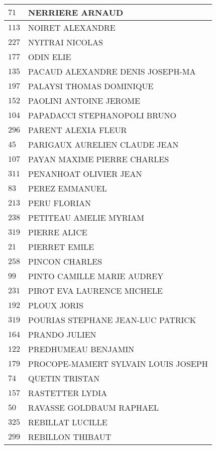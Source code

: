 \begin{xltabular}{\linewidth}{|l|X|}
    \hline
    $71$ & NERRIERE ARNAUD \\
    \hline
    $113$ & NOIRET ALEXANDRE \\
    \hline
    $227$ & NYITRAI NICOLAS \\
    \hline
    $177$ & ODIN ELIE \\
    \hline
    $135$ & PACAUD ALEXANDRE DENIS JOSEPH-MA \\
    \hline
    $197$ & PALAYSI THOMAS DOMINIQUE \\
    \hline
    $152$ & PAOLINI ANTOINE JEROME \\
    \hline
    $104$ & PAPADACCI STEPHANOPOLI BRUNO \\
    \hline
    $296$ & PARENT ALEXIA FLEUR \\
    \hline
    $45$ & PARIGAUX AURELIEN CLAUDE JEAN \\
    \hline
    $107$ & PAYAN MAXIME PIERRE CHARLES \\
    \hline
    $311$ & PENANHOAT OLIVIER JEAN \\
    \hline
    $83$ & PEREZ EMMANUEL \\
    \hline
    $213$ & PERU FLORIAN \\
    \hline
    $238$ & PETITEAU AMELIE MYRIAM \\
    \hline
    $319$ & PIERRE ALICE \\
    \hline
    $21$ & PIERRET EMILE \\
    \hline
    $258$ & PINCON CHARLES \\
    \hline
    $99$ & PINTO CAMILLE MARIE AUDREY \\
    \hline
    $231$ & PIROT EVA LAURENCE MICHELE \\
    \hline
    $192$ & PLOUX JORIS \\
    \hline
    $319$ & POURIAS STEPHANE JEAN-LUC PATRICK \\
    \hline
    $164$ & PRANDO JULIEN \\
    \hline
    $122$ & PREDHUMEAU BENJAMIN \\
    \hline
    $179$ & PROCOPE-MAMERT SYLVAIN LOUIS JOSEPH \\
    \hline
    $74$ & QUETIN TRISTAN \\
    \hline
    $157$ & RASTETTER LYDIA \\
    \hline
    $50$ & RAVASSE GOLDBAUM RAPHAEL \\
    \hline
    $325$ & REBILLAT LUCILLE \\
    \hline
    $299$ & REBILLON THIBAUT \\
    \hline

\end{xltabular}
